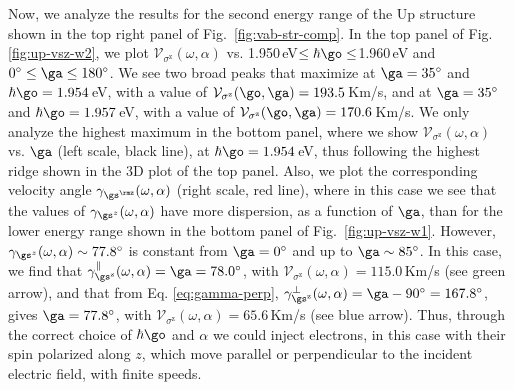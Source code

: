 \documentclass[floatfix,prb,aps,superscriptaddress,showpacs,11pt,preprint,letterpaper]{revtex4}
\begin{document}
Now, we analyze the results for the second energy range of the Up structure
shown in the top right panel of Fig.~\ref{fig:vab-str-comp}. In the top panel
of Fig. \ref{fig:up-vsz-w2}, we plot $\mathcal{V}_{\sigma^{\mathrm{z}}}
(\omega,\alpha)$ vs. 1.950\,eV$\leq\hbar\go\leq$1.960\,eV and
$0^\circ\leq\ga\leq 180^\circ$.
% 
We see two broad peaks that maximize at $\ga=35^{\circ}$ and $\hbar\go=
1.954$\,eV, with a value of $\mathcal{V}_{\sigma^{\mathrm{z}}}(\go,\ga) =
193.5$\,Km/s, and at $\ga=35^{\circ}$ and $\hbar\go= 1.957$\,eV, with a value
of $\mathcal{V}_{\sigma^{\mathrm{z}}}(\go,\ga) = 170.6$\,Km/s. 
% 
We only analyze the highest  maximum in the bottom panel, where we  show
$\mathcal{V}_{\sigma^{\mathrm{z}}} (\omega,\alpha)$ vs. $\ga$ (left scale,
black line), at $\hbar\go= 1.954$\,eV, thus following the highest ridge shown
in the 3D plot of the top panel. Also, we plot the corresponding
velocity angle $\gamma_{\gs^\rmz}(\omega,\alpha)$ (right scale, red
line),
where in
this case we see that the values of $\gamma_{\gs^z}(\omega,\alpha)$ have more
dispersion, as a function of $\ga$, than for the lower energy range shown in
the bottom panel of Fig.~\ref{fig:up-vsz-w1}.
% 
However, $\gamma_{\gs^z}(\omega,\alpha)\sim 77.8^\circ$ is constant from
$\ga=0^\circ$ and up to $\ga\sim 85^\circ$. In this case, we find that
$\gamma^\parallel_{\gs^\mathrm{z}}(\omega,\alpha)=\ga=78.0^\circ$, with
$\mathcal{V}_{\sigma^{\mathrm{z}}}(\omega,\alpha) = 115.0$\,Km/s (see green
arrow), and that from Eq. \eqref{eq:gamma-perp},
$\gamma^\perp_{\gs^\mathrm{z}}(\omega,\alpha)=\ga-90^\circ=167.8^\circ$, gives
$\ga=77.8^\circ$, with $\mathcal{V}_{\sigma^{\mathrm{z}}}(\omega,\alpha) =
65.6$\,Km/s (see blue arrow). 
% 
Thus, through the correct choice of $\hbar\go$ and $\alpha$ we could inject
electrons, in this case with their spin polarized along $z$, which move parallel
or perpendicular to the incident electric field, with finite speeds.

\end{document}
